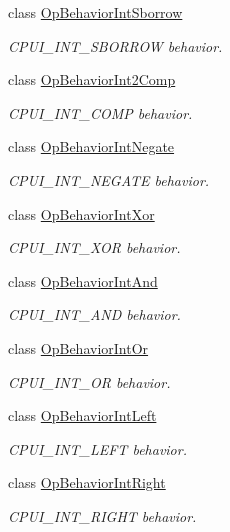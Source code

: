 \begin{DoxyCompactItemize}
class \mbox{\hyperlink{class_op_behavior_int_sborrow}{Op\+Behavior\+Int\+Sborrow}}
\begin{DoxyCompactList}\small\item\em C\+P\+U\+I\+\_\+\+I\+N\+T\+\_\+\+S\+B\+O\+R\+R\+OW behavior. \end{DoxyCompactList}\item 
class \mbox{\hyperlink{class_op_behavior_int2_comp}{Op\+Behavior\+Int2\+Comp}}
\begin{DoxyCompactList}\small\item\em C\+P\+U\+I\+\_\+\+I\+N\+T\+\_\+C\+O\+MP behavior. \end{DoxyCompactList}\item 
class \mbox{\hyperlink{class_op_behavior_int_negate}{Op\+Behavior\+Int\+Negate}}
\begin{DoxyCompactList}\small\item\em C\+P\+U\+I\+\_\+\+I\+N\+T\+\_\+\+N\+E\+G\+A\+TE behavior. \end{DoxyCompactList}\item 
class \mbox{\hyperlink{class_op_behavior_int_xor}{Op\+Behavior\+Int\+Xor}}
\begin{DoxyCompactList}\small\item\em C\+P\+U\+I\+\_\+\+I\+N\+T\+\_\+\+X\+OR behavior. \end{DoxyCompactList}\item 
class \mbox{\hyperlink{class_op_behavior_int_and}{Op\+Behavior\+Int\+And}}
\begin{DoxyCompactList}\small\item\em C\+P\+U\+I\+\_\+\+I\+N\+T\+\_\+\+A\+ND behavior. \end{DoxyCompactList}\item 
class \mbox{\hyperlink{class_op_behavior_int_or}{Op\+Behavior\+Int\+Or}}
\begin{DoxyCompactList}\small\item\em C\+P\+U\+I\+\_\+\+I\+N\+T\+\_\+\+OR behavior. \end{DoxyCompactList}\item 
class \mbox{\hyperlink{class_op_behavior_int_left}{Op\+Behavior\+Int\+Left}}
\begin{DoxyCompactList}\small\item\em C\+P\+U\+I\+\_\+\+I\+N\+T\+\_\+\+L\+E\+FT behavior. \end{DoxyCompactList}\item 
class \mbox{\hyperlink{class_op_behavior_int_right}{Op\+Behavior\+Int\+Right}}
\begin{DoxyCompactList}\small\item\em C\+P\+U\+I\+\_\+\+I\+N\+T\+\_\+\+R\+I\+G\+HT behavior. \end{DoxyCompactList}\item 

\end{DoxyCompactItemize}
